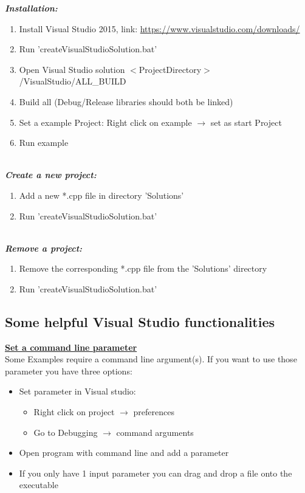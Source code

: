 \documentclass[]{article}
\begin{document}
\textit{\textbf{Installation:}}
\begin{enumerate}
	\item Install Visual Studio 2015, link: \url{https://www.visualstudio.com/downloads/}
	\item Run 'createVisualStudioSolution.bat'
	\item Open Visual Studio solution $<$ProjectDirectory$>$/VisualStudio/ALL\_BUILD
	\item Build all (Debug/Release libraries should both be linked)
	\item Set a example Project: Right click on example $\rightarrow$ set as start Project
	\item Run example 
\end{enumerate}

\mbox{} \\
\textit{\textbf{Create a new project:}}
\begin{enumerate}
\item Add a new *.cpp file in directory 'Solutions'
\item Run 'createVisualStudioSolution.bat'
\end{enumerate}

\mbox{} \\
\textit{\textbf{Remove a project:}}
\begin{enumerate}
\item Remove the corresponding *.cpp file from the 'Solutions' directory
\item Run 'createVisualStudioSolution.bat' \\
\end{enumerate}

\subsection{Some helpful Visual Studio functionalities \\}

\underline{\textbf{Set a command line parameter}} \\

Some Examples require a command line argument(s). If you want to use those parameter you have three options:
\begin{itemize}
	\item Set parameter in Visual studio:
	\begin{itemize}
		\item Right click on project $\rightarrow$ preferences
		\item Go to Debugging $\rightarrow$ command arguments
	\end{itemize}
	\item Open program with command line and add a parameter
	\item If you only have 1 input parameter you can drag and drop a file onto the executable
\end{itemize}
\end{document}
